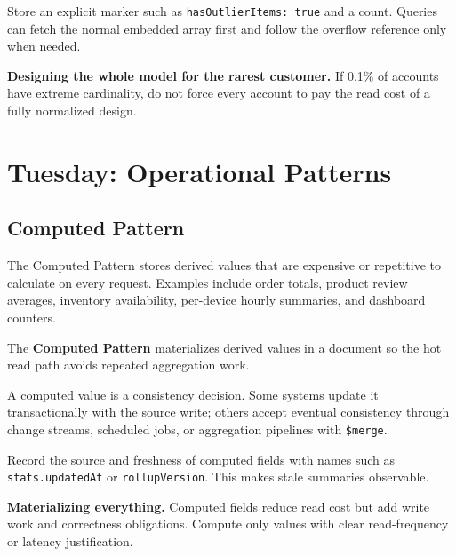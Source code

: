 \begin{tipbox}
Store an explicit marker such as \texttt{hasOutlierItems: true} and a count. Queries can fetch the normal embedded array first and follow the overflow reference only when needed.
\end{tipbox}

\begin{pitfall}
\textbf{Designing the whole model for the rarest customer.} If 0.1\% of accounts have extreme cardinality, do not force every account to pay the read cost of a fully normalized design.
\end{pitfall}

\section{Tuesday: Operational Patterns}
\subsection{Computed Pattern}
The Computed Pattern stores derived values that are expensive or repetitive to calculate on every request. Examples include order totals, product review averages, inventory availability, per-device hourly summaries, and dashboard counters.

\begin{definitionbox}
The \textbf{Computed Pattern} materializes derived values in a document so the hot read path avoids repeated aggregation work.
\end{definitionbox}

\begin{notebox}
A computed value is a consistency decision. Some systems update it transactionally with the source write; others accept eventual consistency through change streams, scheduled jobs, or aggregation pipelines with \texttt{\$merge}.
\end{notebox}

\begin{tipbox}
Record the source and freshness of computed fields with names such as \texttt{stats.updatedAt} or \texttt{rollupVersion}. This makes stale summaries observable.
\end{tipbox}

\begin{pitfall}
\textbf{Materializing everything.} Computed fields reduce read cost but add write work and correctness obligations. Compute only values with clear read-frequency or latency justification.
\end{pitfall}

